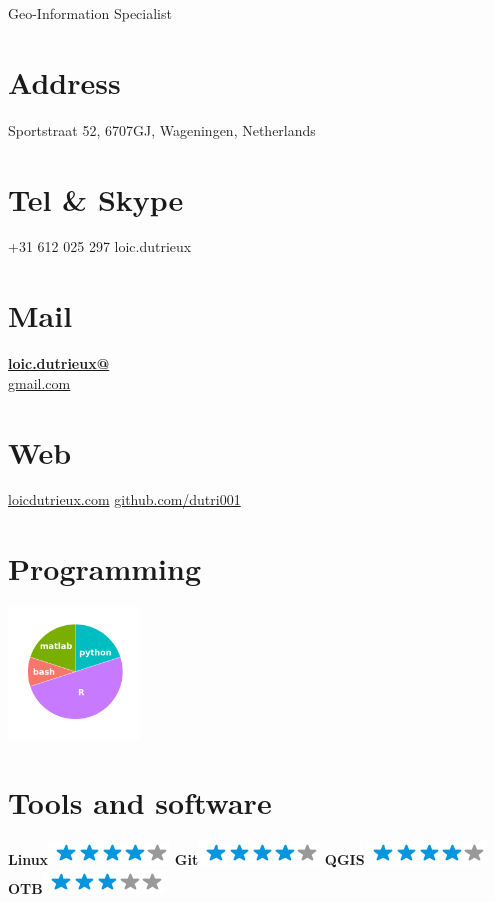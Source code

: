 \documentclass[]{friggeri-cv}
\begin{document}
      {Geo-Information Specialist}
      

\begin{aside}
  \section{Address}
    Sportstraat 52,
    6707GJ, Wageningen, Netherlands
    ~
  \section{Tel \& Skype}
    +31 612 025 297
    loic.dutrieux
    ~
  \section{Mail}
    \href{mailto:loic.dutrieux@gmail.com}{\textbf{loic.dutrieux@}\\gmail.com}
    ~
  \section{Web}
    \href{http://www.loicdutrieux.com}{loicdutrieux.com}
    \href{https://github.com/dutri001}{github.com/dutri001}
    ~
  \section{Programming}
    \includegraphics[width=3.5cm]{img/programming.png}
    ~
  \section{Tools and software}
    \textbf{Linux}\includegraphics[scale=0.40]{img/4stars.png}
    \textbf{Git}\includegraphics[scale=0.40]{img/4stars.png}
    \textbf{QGIS}\includegraphics[scale=0.40]{img/4stars.png}
    \textbf{OTB}\includegraphics[scale=0.40]{img/3stars.png}
    ~

\end{aside}
\end{document}
